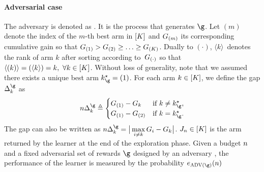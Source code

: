 \paragraph{Adversarial case} 
      The adversary is denoted as \advPro{}. It is the process that 
     generates $\gainVector$.
 Let $(m)$ denote 
the index of the $m$-th best arm in $[K]$
 and $G_{(m)}$ its corresponding 
 cumulative gain
 so that $G_{(1)}> G_{(2)} \geq \ldots 
 \geq G_{(K)}$. Dually to $(\cdot)$, $\langle k \rangle$~denotes 
 the rank of arm $k$ after sorting according to~$G_{(\cdot)}$ so that $\langle (k) 
 \rangle=(\langle k \rangle)=k,~ \forall k\in [K]$.
Without loss of generality, note that we assumed there 
exists
 a unique best arm $\bestArm_{\gainVector}=(1)$. %
%
%
For each arm $k\in [K]$, we define the gap 
$\gap^\gainVector_k$ as
%
\begin{align*} 
\timeHorizon\gap^\gainVector_{k} \triangleq \begin{cases}  
\cumulGain_{(1)}-\cumulGain_{k} & \text{if } k \neq \bestArm_{\gainVector}, \\
\cumulGain_{(1)}-\cumulGain_{(2)}       & \text{if } k =\bestArm_{\gainVector}.
\end{cases}%
\end{align*}
%
The gap can also be written as 
$\timeHorizon\gap^\gainVector_{k} = \big|\max\limits_{i \neq k} 
\cumulGain_{i} - \cumulGain_{k}\big|$. 
%
%
 $J_{n} \in [K]$ is the  arm 
returned by the learner at the end of the exploration phase.  
Given a budget
  $n$ and a fixed adversarial set of rewards 
  $\gainVector$ designed by an  adversary \advPro{}, the
   performance of the learner is measured by the 
   probability
    $\ProErr_{\advPro(\gainVector)}(\timeHorizon)$ 
